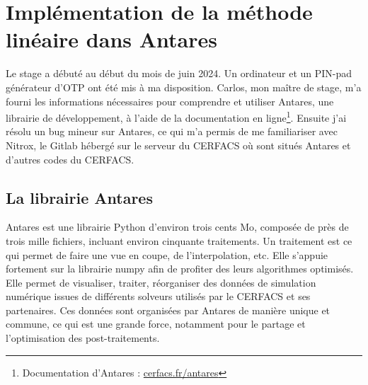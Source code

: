 \chapter{Implémentation de la méthode linéaire dans Antares}




Le stage a débuté au début du mois de juin 2024. Un ordinateur et un PIN-pad générateur d'\ac{OTP} ont été mis à ma disposition. Carlos, mon maître de stage, m'a fourni les informations nécessaires pour comprendre et utiliser Antares\cite{antares}, une librairie de développement, à l'aide de la documentation en ligne\footnote{Documentation d'Antares : \href{https://cerfacs.fr/antares/}{cerfacs.fr/antares}}. Ensuite j'ai résolu un bug mineur sur Antares, ce qui m'a permis de me familiariser avec Nitrox, le Gitlab hébergé sur le serveur du CERFACS où sont situés Antares et d'autres codes du CERFACS.


\section{La librairie Antares}

Antares est une librairie Python d'environ trois cents \ac{Mo}, composée de près de trois mille fichiers, incluant environ cinquante traitements. Un traitement est ce qui permet de faire une vue en coupe, de l'interpolation, etc.
Elle s'appuie fortement sur la librairie numpy afin de profiter des leurs algorithmes optimisés.
Elle permet de visualiser, traiter, réorganiser des données de simulation numérique issues de différents solveurs utilisés par le CERFACS et ses partenaires. Ces données sont organisées par Antares de manière unique et commune, ce qui est une grande force, notamment pour le partage et l'optimisation des post-traitements.


